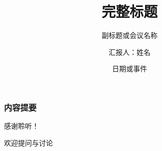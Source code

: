 \documentclass[10pt,aspectratio=169]{beamer}
\title[短标题]{完整标题}
\subtitle{副标题或会议名称}
\author[作者名]{汇报人：姓名}
\institute[机构简称]{
  机构全名或部门名称
}
\date{日期或事件}
\begin{document}
\frame{\titlepage}

\begin{frame}
  \frametitle{内容提要}
  \tableofcontents
\end{frame}







\begin{frame}
  \centering
  \Huge{感谢聆听！}

  \vspace{1cm}
  \Large{欢迎提问与讨论}
\end{frame}
\end{document}
